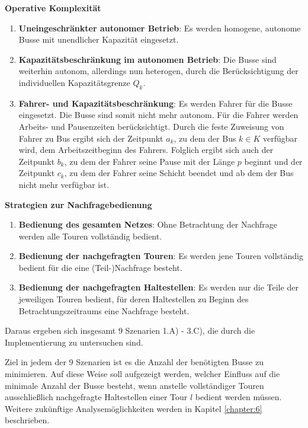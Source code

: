 \textbf{Operative Komplexität}
\begin{enumerate}
    \item \textbf{Uneingeschränkter autonomer Betrieb}: Es werden homogene, autonome Busse mit unendlicher Kapazität eingesetzt.
    \item \textbf{Kapazitätsbeschränkung im autonomen Betrieb}: Die Busse sind weiterhin autonom, allerdings nun heterogen, durch die Berücksichtigung der individuellen Kapazitätsgrenze $Q_k$.
    \item \textbf{Fahrer- und Kapazitätsbeschränkung}: Es werden Fahrer für die Busse eingesetzt. Die Busse sind somit nicht mehr autonom. Für die Fahrer werden Arbeits- und Pausenzeiten berücksichtigt. Durch die feste Zuweisung von Fahrer zu Bus ergibt sich der Zeitpunkt $a_k$, zu dem der Bus $k \in K$ verfügbar wird, dem Arbeitszeitbeginn des Fahrers. Folglich ergibt sich auch der Zeitpunkt $b_k$, zu dem der Fahrer seine Pause mit der Länge $p$ beginnt und der Zeitpunkt $c_k$, zu dem der Fahrer seine Schicht beendet und ab dem der Bus nicht mehr verfügbar ist. 
\end{enumerate}
\textbf{Strategien zur Nachfragebedienung}
\begin{enumerate}[label=\Alph*)]
    \item \textbf{Bedienung des gesamten Netzes}: Ohne Betrachtung der Nachfrage werden alle Touren vollständig bedient.
    \item \textbf{Bedienung der nachgefragten Touren}: Es werden jene Touren vollständig bedient für die eine (Teil-)Nachfrage besteht.
    \item \textbf{Bedienung der nachgefragten Haltestellen}: Es werden nur die Teile der jeweiligen Touren bedient, für deren Haltestellen zu Beginn des Betrachtungszeitraums eine Nachfrage besteht.
\end{enumerate}

Daraus ergeben sich insgesamt 9 Szenarien 1.A) - 3.C), die durch die Implementierung zu untersuchen sind.

Ziel in jedem der 9 Szenarien ist es die Anzahl der benötigten Busse zu minimieren. Auf diese Weise soll aufgezeigt werden, welcher Einfluss auf die minimale Anzahl der Busse besteht, wenn anstelle vollständiger Touren ausschließlich nachgefragte Haltestellen einer Tour $l$ bedient werden müssen.
Weitere zukünftige Analysemöglichkeiten werden in Kapitel \ref{chapter:6} beschrieben.


